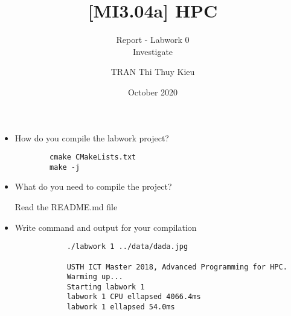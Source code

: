 \documentclass[10pt, a4paper]{article}
\title{[MI3.04a] HPC}
\subtitle{Report - Labwork 0 \\ Investigate}
\author{TRAN Thi Thuy Kieu}
\date{October 2020}
\begin{document}
\maketitle

\begin{itemize}
    \item How do you compile the labwork project?
    
    \vspace{1mm}
    \begin{verbatim}
        cmake CMakeLists.txt
        make -j
    \end{verbatim}
    
    \item What do you need to compile the project? 
    
     \vspace{1mm}
    Read the README.md file
    

    \item Write command and output for your compilation
    
    \vspace{1mm}
        \begin{verbatim}
            ./labwork 1 ../data/dada.jpg
            
            USTH ICT Master 2018, Advanced Programming for HPC.
            Warming up...
            Starting labwork 1
            labwork 1 CPU ellapsed 4066.4ms
            labwork 1 ellapsed 54.0ms
        \end{verbatim}
    
\end{itemize}
\end{document}
